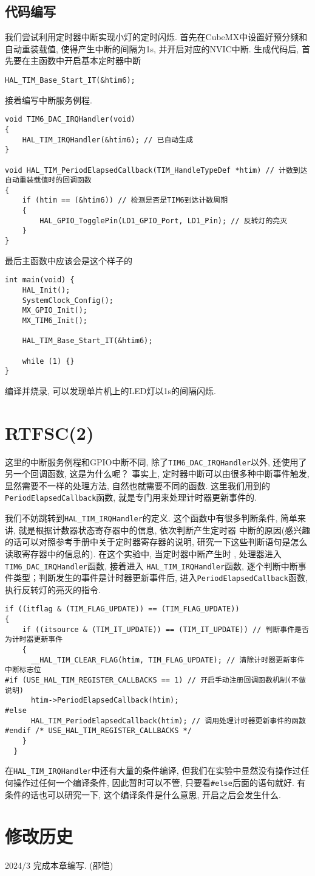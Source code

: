 \subsection{代码编写}
我们尝试利用定时器中断实现小灯的定时闪烁. 首先在CubeMX中设置好预分频和自动重装载值, 使得产生中断的间隔为1s, 并开启对应的NVIC中断. 生成代码后, 首先要在主函数中开启基本定时器中断
\begin{lstlisting}
HAL_TIM_Base_Start_IT(&htim6);
\end{lstlisting}
接着编写中断服务例程.
\begin{lstlisting}
void TIM6_DAC_IRQHandler(void)
{
    HAL_TIM_IRQHandler(&htim6); // 已自动生成
}

void HAL_TIM_PeriodElapsedCallback(TIM_HandleTypeDef *htim) // 计数到达自动重装载值时的回调函数
{
    if (htim == (&htim6)) // 检测是否是TIM6到达计数周期
    {
        HAL_GPIO_TogglePin(LD1_GPIO_Port, LD1_Pin); // 反转灯的亮灭
    }
}
\end{lstlisting}
最后主函数中应该会是这个样子的
\begin{lstlisting}
int main(void) {
    HAL_Init();
    SystemClock_Config();
    MX_GPIO_Init();
    MX_TIM6_Init();

    HAL_TIM_Base_Start_IT(&htim6);

    while (1) {}
}
\end{lstlisting}
编译并烧录, 可以发现单片机上的LED灯以1s的间隔闪烁.
\section{RTFSC(2)}
这里的中断服务例程和GPIO中断不同, 除了\verb|TIM6_DAC_IRQHandler|以外, 还使用了另一个回调函数, 这是为什么呢？
事实上, 定时器中断可以由很多种中断事件触发, 显然需要不一样的处理方法, 自然也就需要不同的函数. 这里我们用到的
\verb|PeriodElapsedCallback|函数, 就是专门用来处理计时器更新事件的.

我们不妨跳转到\verb|HAL_TIM_IRQHandler|的定义. 这个函数中有很多判断条件, 简单来讲, 就是根据计数器状态寄存器中的信息, 依次判断产生定时器
中断的原因(感兴趣的话可以对照参考手册中关于定时器寄存器的说明, 研究一下这些判断语句是怎么读取寄存器中的信息的). 在这个实验中, 当定时器中断产生时
, 处理器进入 \verb|TIM6_DAC_IRQHandler|函数, 接着进入 \verb|HAL_TIM_IRQHandler|函数, 逐个判断中断事件类型；判断发生的事件是计时器更新事件后,
进入\verb|PeriodElapsedCallback|函数, 执行反转灯的亮灭的指令.
\begin{lstlisting}
if ((itflag & (TIM_FLAG_UPDATE)) == (TIM_FLAG_UPDATE))
{
    if ((itsource & (TIM_IT_UPDATE)) == (TIM_IT_UPDATE)) // 判断事件是否为计时器更新事件
    {
      __HAL_TIM_CLEAR_FLAG(htim, TIM_FLAG_UPDATE); // 清除计时器更新事件中断标志位
#if (USE_HAL_TIM_REGISTER_CALLBACKS == 1) // 开启手动注册回调函数机制(不做说明)
      htim->PeriodElapsedCallback(htim); 
#else
      HAL_TIM_PeriodElapsedCallback(htim); // 调用处理计时器更新事件的函数
#endif /* USE_HAL_TIM_REGISTER_CALLBACKS */
    }
  }
\end{lstlisting}
在\verb|HAL_TIM_IRQHandler|中还有大量的条件编译, 但我们在实验中显然没有操作过任何操作过任何一个编译条件, 因此暂时可以不管, 只要看\verb|#else|后面的语句就好.
有条件的话也可以研究一下, 这个编译条件是什么意思, 开启之后会发生什么.


\section{修改历史}

2024/3 完成本章编写. (邵恺)
